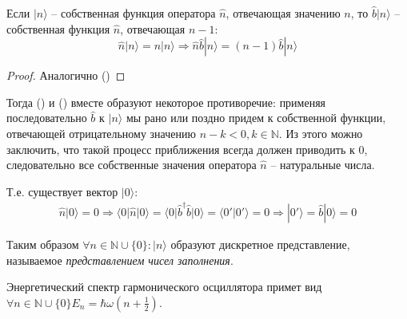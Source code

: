 \documentclass[__main__.tex]{subfiles}
\begin{document}
	\begin{theorem}
		Если $|n\rangle$ -- собственная функция оператора $\hat{n}$, отвечающая значению $n$, то $\hat{b}|n\rangle$ -- собственная функция $\hat{n}$, отвечающая $n-1$:
		$$
		\hat{n}|n\rangle=n|n\rangle\Longrightarrow\hat{n}\hat{b}|n\rangle=(n-1)\hat{b}|n\rangle
		$$
	\end{theorem}
	\begin{proof}
		Аналогично ()
	\end{proof}
	Тогда () и () вместе образуют некоторое противоречие: применяя последовательно $\hat{b}$ к $|n\rangle$ мы рано или поздно придем к собственной функции, отвечающей отрицательному значению $n-k<0,k\in\mathbb{N}$. Из этого можно заключить, что такой процесс приближения всегда должен приводить к $0$, следовательно все собственные значения оператора $\hat{n}$ -- натуральные числа.
	
	Т.е. существует вектор $|0\rangle$:
	\begin{gather*}
	\hat{n}|0\rangle = 0
	\Longrightarrow
	\langle 0|\hat{n}|0\rangle = \langle 0|\hat{b}^\dagger\hat{b}|0\rangle = \langle 0'|0'\rangle = 0
	\Longrightarrow
	|0'\rangle = \hat{b}|0\rangle = 0
	\end{gather*}
	
	Таким образом $\forall n\in\mathbb{N}\cup\{0\}\colon|n\rangle$ образуют дискретное представление, называемое \textit{представлением чисел заполнения}.
	
   	Энергетический спектр гармонического осциллятора примет вид $\forall n\in\mathbb{N}\cup\{0\}E_n=\hbar\omega\left(n+\frac{1}{2}\right)$.\\
\end{document}
